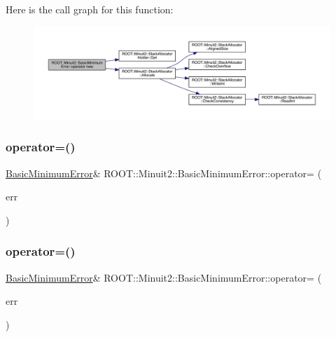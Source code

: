 Here is the call graph for this function\+:
\nopagebreak
\begin{figure}[H]
\begin{center}
\leavevmode
\includegraphics[width=350pt]{d9/ddd/classROOT_1_1Minuit2_1_1BasicMinimumError_a722b14848c4cb4144f4ba7cdf90e5ef3_cgraph}
\end{center}
\end{figure}
\mbox{\label{classROOT_1_1Minuit2_1_1BasicMinimumError_a83389971838f6e91a3b632604c227571}} 
\subsubsection{\texorpdfstring{operator=()}{operator=()}\hspace{0.1cm}{\footnotesize\ttfamily [1/2]}}
{\footnotesize\ttfamily \mbox{\hyperlink{classROOT_1_1Minuit2_1_1BasicMinimumError}{Basic\+Minimum\+Error}}\& R\+O\+O\+T\+::\+Minuit2\+::\+Basic\+Minimum\+Error\+::operator= (\begin{DoxyParamCaption}\item[{const \mbox{\hyperlink{classROOT_1_1Minuit2_1_1BasicMinimumError}{Basic\+Minimum\+Error}} \&}]{err }\end{DoxyParamCaption})\hspace{0.3cm}{\ttfamily [inline]}}

\mbox{\label{classROOT_1_1Minuit2_1_1BasicMinimumError_a83389971838f6e91a3b632604c227571}} 
\subsubsection{\texorpdfstring{operator=()}{operator=()}\hspace{0.1cm}{\footnotesize\ttfamily [2/2]}}
{\footnotesize\ttfamily \mbox{\hyperlink{classROOT_1_1Minuit2_1_1BasicMinimumError}{Basic\+Minimum\+Error}}\& R\+O\+O\+T\+::\+Minuit2\+::\+Basic\+Minimum\+Error\+::operator= (\begin{DoxyParamCaption}\item[{const \mbox{\hyperlink{classROOT_1_1Minuit2_1_1BasicMinimumError}{Basic\+Minimum\+Error}} \&}]{err }\end{DoxyParamCaption})\hspace{0.3cm}{\ttfamily [inline]}}



